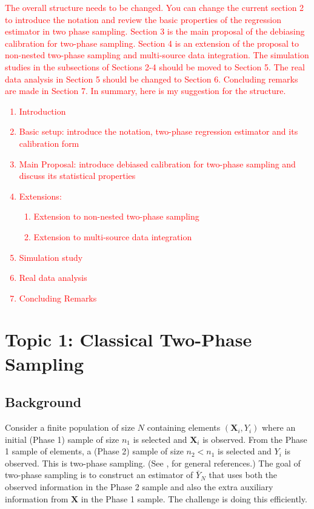 \documentclass[12pt]{article}
\renewcommand{\bf}[1]{\mathbf{#1}}
\begin{document}
\textcolor{red}{The overall structure needs to be changed. You can change the current section 2 to introduce the notation and review the basic properties of the regression estimator in two phase sampling. Section 3 is the main proposal of the debiasing calibration for two-phase sampling. Section 4 is an extension of the proposal to non-nested two-phase sampling and multi-source data integration. The simulation studies in the subsections of Sections 2-4 should be moved to Section 5. The real data analysis in Section 5 should be changed to Section 6. Concluding remarks are made in Section 7. In summary, here is my suggestion for the structure.
\begin{enumerate}
\item Introduction
\item Basic setup: introduce the notation, two-phase regression estimator and its calibration form
\item Main Proposal: introduce debiased calibration for two-phase sampling and discuss its statistical properties 
\item Extensions: \begin{enumerate}
\item Extension to non-nested two-phase sampling 
\item Extension to multi-source data integration
\end{enumerate}
\item Simulation study 
\item Real data analysis 
\item Concluding Remarks 
\end{enumerate}
}

\section{Topic 1: Classical Two-Phase Sampling}

\subsection{Background}

Consider a finite population of size $N$ containing elements $(\bf X_i, Y_i)$ where
an initial (Phase 1) sample of size $n_1$ is selected and $\bf X_i$ is observed.
From the Phase 1 sample of elements, a (Phase 2) sample of size $n_2 < n_1$ is
selected and $Y_i$ is observed. This is two-phase sampling. (See 
\cite{fuller2009sampling}, \cite{kim2024statistics} for general references.) The
goal of two-phase sampling is to construct an estimator of $\bar Y_N$ 
that uses both the observed information in the Phase 2 sample and also the extra
auxiliary information from $\bf X$ in the Phase 1 sample.
The challenge is doing this efficiently.
\end{document}
